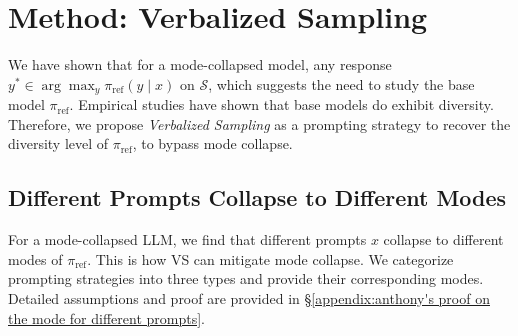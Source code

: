 \newcommand{\one}{\mathbf{1}}
\newcommand{\supp}{\operatorname{supp}}
\newcommand{\simplex}{\Delta}

\section{Method: Verbalized Sampling}\label{sec:vs}
 We have shown that for a mode-collapsed model, any response $y^* \in \arg\max_y \pi_\text{ref}(y \mid x)$ on $\mathcal{S}$, which suggests the need to study the base model $\pi_\text{ref}  $. %
 Empirical studies \citep{west2025basemodelsbeataligned, zhu2025bareleveragingbaselanguage} have shown that base models do exhibit diversity. Therefore, we propose \emph{Verbalized Sampling} as a prompting strategy to recover the diversity level of $\pi_{\textrm{ref}}$, to bypass mode collapse. 



\subsection{Different Prompts Collapse to Different Modes}\label{subsec:constrained}


For a mode-collapsed LLM, we find that different prompts $x$ collapse to different modes of $\pi_\text{ref}$. This is how VS can mitigate mode collapse. We categorize prompting strategies into three types and provide their corresponding modes. Detailed assumptions and proof are provided in \S\ref{appendix:anthony's proof on the mode for different prompts}. %




